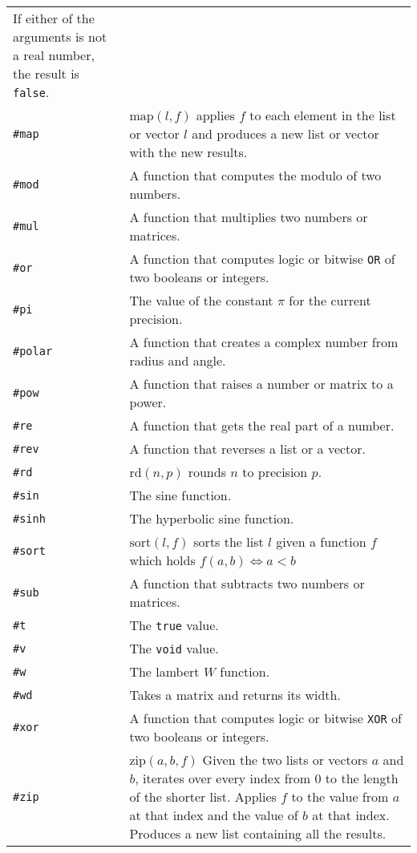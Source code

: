 \documentclass[10pt]{article}
\begin{document}
\begin{longtable}{p{}p{}}
                         If either of the arguments is not a real number, the result is \verb|false|. \\
        \verb|#map|    & $ \mathrm{map}(l,f) $ applies $ f $ to each element in the list or vector  $ l $ and produces a new list or vector with the new results. \\
        \verb|#mod|    & A function that computes the modulo of two numbers. \\
        \verb|#mul|    & A function that multiplies two numbers or matrices. \\
        \verb|#or|     & A function that computes logic or bitwise \verb|OR| of two booleans or integers. \\
        \verb|#pi|     & The value of the constant $ \pi $ for the current precision. \\
        \verb|#polar|  & A function that creates a complex number from radius and angle. \\
        \verb|#pow|    & A function that raises a number or matrix to a power. \\
        \verb|#re|     & A function that gets the real part of a number. \\
        \verb|#rev|    & A function that reverses a list or a vector. \\
        \verb|#rd |    & $ \mathrm{rd}(n,p) $ rounds $ n $ to precision $ p $. \\
        \verb|#sin|    & The sine function. \\
        \verb|#sinh|   & The hyperbolic sine function. \\
        \verb|#sort|   & $ \mathrm{sort}(l,f) $ sorts the list $ l $ given a function $ f $ which holds $ f(a,b) \iff a < b $ \\
        \verb|#sub|    & A function that subtracts two numbers or matrices. \\
        \verb|#t|      & The \verb|true| value. \\
        \verb|#v|      & The \verb|void| value. \\
        \verb|#w|      & The lambert $ W $ function. \\
        \verb|#wd|     & Takes a matrix and returns its width. \\
        \verb|#xor|    & A function that computes logic or bitwise \verb|XOR| of two booleans or integers. \\
        \verb|#zip|    & $ \mathrm{zip}(a,b,f) $ Given the two lists or vectors $ a $ and $ b $, iterates over every index from $ 0 $ to the length of the shorter list.
                         Applies $ f $ to the value from $ a $ at that index and the value of $ b $ at that index.
                         Produces a new list containing all the results. \\
    \end{longtable}
\end{document}
